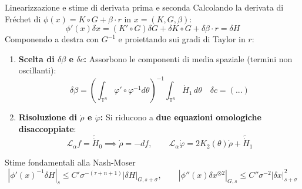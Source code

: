 \documentclass[10pt,aspectratio=169]{beamer}
\newcommand{\T}{\mathbb{T}}
\newcommand{\blu}[1]{\textcolor{UniBlue}{\textbf{#1}}}
\begin{document}
\begin{frame}{Linearizzazione e stime di derivata prima e seconda}
  Calcolando la derivata di Fréchet di $\phi(x) = K \circ G + \beta \cdot r$ in $x=(K, G, \beta)$:
  \[
    \phi'(x)\delta x = (K' \circ G)\delta G + \delta K \circ G + \delta\beta \cdot r = \delta H
  \]
  Componendo a destra con $G^{-1}$ e proiettando sui gradi di Taylor in $r$:
  \begin{enumerate}
    \item \blu{Scelta di $\delta\beta$ e $\delta c$:} Assorbono le componenti di media spaziale (termini non oscillanti):
    \[
      \delta\beta = \left(\int_{\T^n} \varphi' \circ \varphi^{-1} d\theta\right)^{-1} \int_{\T^n} \dot{H}_1 \, d\theta \quad \delta c = (...)
    \]
    \item \blu{Risoluzione di $\dot{\rho}$ e $\dot{\varphi}$:} Si riducono a \textbf{due equazioni omologiche disaccoppiate}:
    \[
      \mathcal{L}_\alpha f = \widetilde{\dot{H}}_0 \implies \dot{\rho} = -df, \qquad \mathcal{L}_\alpha \dot{\varphi} = 2K_2(\theta)\dot{\rho} + \widetilde{\dot{H}}_1
    \]
  \end{enumerate}
  \begin{alertblock}{Stime fondamentali alla Nash-Moser}
    \[
      |\phi'(x)^{-1}\delta H|_s \le C' \sigma^{-(\tau+n+1)} |\delta H|_{G, s+\sigma}, \qquad |\phi''(x)\delta x^{\otimes 2}|_{G, s} \le C'' \sigma^{-2} |\delta x|_{s+\sigma}^2
    \]
  \end{alertblock}
\end{frame}
\end{document}
